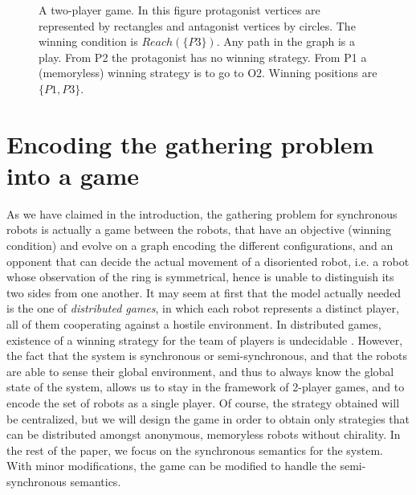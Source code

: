 \documentclass[envcountsame]{llncs} \usepackage[english]{babel}
\newcommand{\Reach}{\ensuremath{\mathit{Reach}}}
\begin{document}
\begin{figure}[t]
\centering 
{} \caption{A two-player game. In this figure protagonist vertices are
represented by rectangles and antagonist vertices by circles. 
The winning condition is $\Reach(\{P3\})$. Any path in the graph is a play.
From P2 the protagonist has no winning strategy. From P1 a (memoryless) winning strategy is to go to O2.
Winning positions are $\{P1,P3\}$.} 
\label{fig:synth}
\end{figure}

 




\section{Encoding the gathering problem into a game}\label{sec:game}
As we have claimed in the introduction, the gathering problem for synchronous robots is actually a game between the robots,
that have an objective (winning condition) and evolve on a graph encoding the different configurations, and an opponent that can decide
the actual movement of a disoriented robot, i.e. a robot whose observation of the ring is symmetrical, hence is unable to distinguish its
two sides from one another. It may seem at first
that the model actually needed is the one of \emph{distributed games}, in which each robot represents a distinct player, all of them cooperating against a hostile environment. In distributed games, existence of a winning strategy
for the team of players is undecidable \cite{PetersonReif79}. However, the fact that the system is synchronous or semi-synchronous,
and that the robots are able to sense their global environment, and thus to always know the global state of the system, allows us to
stay in the framework of 2-player games, and to encode the set of robots as a single player. 
Of course, the strategy obtained will
be centralized, but we will design the game in order to obtain only strategies that can be distributed amongst anonymous, memoryless robots without chirality.
In the rest of the paper, we focus on the synchronous semantics for the system. With minor modifications, the
game can be modified to handle the semi-synchronous semantics.
\end{document}
